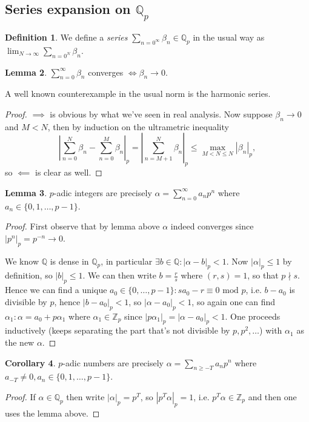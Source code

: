 \documentclass{article}
\newcommand{\Z}{\mathbb{Z}}
\newcommand{\Q}{\mathbb{Q}}
\newcommand{\Mod}{\text{ mod }}
\theoremstyle{definition}
\newtheorem{defn}{Definition}[subsection]
\newtheorem{lemma}[defn]{Lemma}
\newtheorem{coro}[defn]{Corollary}
\begin{document}
\subsection{Series expansion on $\Q_p$}
\begin{defn}
We define a \textit{series} $\sum_{n=0^\infty}\beta_n\in\Q_p$ in the usual way as $\lim_{N\rightarrow\infty}\sum_{n=0^N}\beta_n$.
\end{defn}
\begin{lemma}
$\sum_{n=0}^\infty\beta_n$ converges $\iff\beta_n\rightarrow 0$.
\end{lemma}
A well known counterexample in the usual norm is the harmonic series.
\begin{proof}
$\implies$ is obvious by what we've seen in real analysis. Now suppose $\beta_n\rightarrow 0$ and $M<N$, then by induction on the ultrametric inequality
\[
\left|\sum_{n=0}^N\beta_n-\sum_{n=0}^M\beta_n\right|_p=\left|\sum_{n=M+1}^N\beta_n\right|_p\leq \max_{M<N\leq N} |\beta_n|_p,
\]
so $\impliedby$ is clear as well.
\end{proof}

\begin{lemma}
\label{lemma:padicasseries}
$p$-adic integers are precisely $\alpha=\sum_{n=0}^\infty a_np^n$ where $a_n\in\{0,1,\ldots,p-1\}$.
\end{lemma}
\begin{proof}
First observe that by lemma above $\alpha$ indeed converges since $|p^n|_p=p^{-n}\rightarrow 0$.

We know $\Q$ is dense in $\Q_p$, in particular $\exists b\in\Q:|\alpha-b|_p<1$. Now $|\alpha|_p\leq 1$ by definition, so $|b|_p\leq 1$. We can then write $b=\frac{r}{s}$ where $(r,s)=1$, so that $p\nmid s$. Hence we can find a unique $a_0\in\{0,\ldots,p-1\}:sa_0-r\equiv 0\Mod p$, i.e. $b-a_0$ is divisible by $p$, hence $|b-a_0|_p<1$, so $|\alpha-a_0|_p<1$, so again one can find $\alpha_1:\alpha=a_0+p\alpha_1$ where $\alpha_1\in\Z_p$ since $|p\alpha_1|_p=|\alpha-a_0|_p<1$. One proceeds inductively (keeps separating the part that's not divisible by $p,p^2,\ldots$) with $\alpha_1$ as the new $\alpha$.
\end{proof}

\begin{coro}
$p$-adic numbers are precisely $\alpha=\sum_{n\geq -T}a_np^n$ where $a_{-T}\neq 0,a_n\in\{0,1,\ldots,p-1\}$.
\end{coro}
\begin{proof}
If $\alpha\in\Q_p$ then write $|\alpha|_p=p^T$, so $|p^T\alpha|_p=1$, i.e. $p^T\alpha\in\Z_p$ and then one uses the lemma above.
\end{proof}
\end{document}
